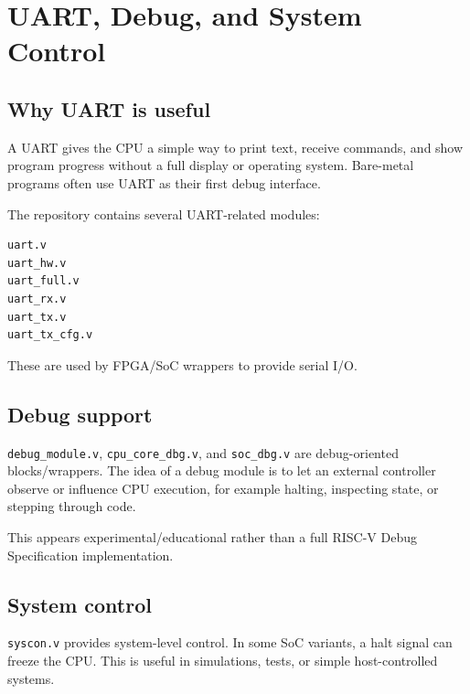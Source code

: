 \section{UART, Debug, and System Control}

\subsection{Why UART is useful}

A UART gives the CPU a simple way to print text, receive commands, and show program progress without a full display or operating system. Bare-metal programs often use UART as their first debug interface.

The repository contains several UART-related modules:

\begin{lstlisting}[language={}]
uart.v
uart_hw.v
uart_full.v
uart_rx.v
uart_tx.v
uart_tx_cfg.v
\end{lstlisting}

These are used by FPGA/SoC wrappers to provide serial I/O.

\subsection{Debug support}

\texttt{debug\_module.v}, \texttt{cpu\_core\_dbg.v}, and \texttt{soc\_dbg.v} are debug-oriented blocks/wrappers. The idea of a debug module is to let an external controller observe or influence CPU execution, for example halting, inspecting state, or stepping through code.

This appears experimental/educational rather than a full RISC-V Debug Specification implementation.

\subsection{System control}

\texttt{syscon.v} provides system-level control. In some SoC variants, a halt signal can freeze the CPU. This is useful in simulations, tests, or simple host-controlled systems.

\bigskip
